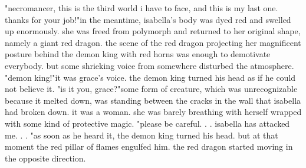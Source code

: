 "necromancer, this is the third world i have to face, and this is my last one.
 thanks for your job!"in the meantime, isabella's body was dyed red and swelled up enormously.
she was freed from polymorph and returned to her original shape, namely a giant red dragon.
the scene of the red dragon projecting her magnificent posture behind the demon king with red horns was enough to demotivate everybody.
 but some shrieking voice from somewhere disturbed the atmosphere.
"demon king!"it was grace's voice.
 the demon king turned his head as if he could not believe it.
 "is it you, grace?"some form of creature, which was unrecognizable because it melted down, was standing between the cracks in the wall that isabella had broken down.
 it was a woman.
  she was barely breathing with herself wrapped with some kind of protective magic.
"please be careful.
.
.
isabella has attacked me.
.
.
"as soon as he heard it, the demon king turned his head.
but at that moment the red pillar of flames engulfed him.
the red dragon started moving in the opposite direction.


 
